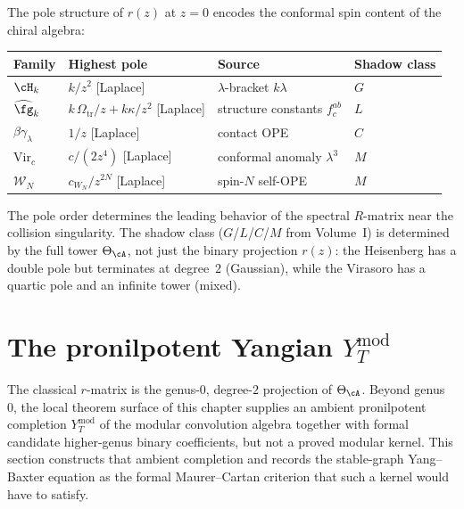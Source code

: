 \begin{remark}
The pole structure of $r(z)$ at $z = 0$ encodes the conformal
spin content of the chiral algebra:
\begin{center}
\small
\renewcommand{\arraystretch}{1.15}
\begin{tabular}{llll}
\textbf{Family} & \textbf{Highest pole} & \textbf{Source} &
\textbf{Shadow class} \\
\hline
$\cH_k$ & $k/z^2$ [Laplace] & $\lambda$-bracket $k\lambda$ & $G$ \\
$\widehat{\fg}_k$ & $k\,\Omega_{\mathrm{tr}}/z + k\kappa/z^2$ [Laplace] & structure constants $f^{ab}_c$ & $L$ \\
$\beta\gamma_\lambda$ & $1/z$ [Laplace] & contact OPE & $C$ \\
$\mathrm{Vir}_c$ & $c/(2z^4)$ [Laplace] & conformal anomaly $\lambda^3$ & $M$ \\
$\mathcal{W}_N$ & $c_{W_N}/z^{2N}$ [Laplace] & spin-$N$ self-OPE & $M$ \\
\end{tabular}
\end{center}
The pole order determines the leading behavior of the spectral
$R$-matrix near the collision singularity. The shadow class
($G$/$L$/$C$/$M$ from Volume~I) is determined by the full tower
$\Theta_\cA$, not just the binary projection $r(z)$: the
Heisenberg has a double pole but terminates at degree~$2$
(Gaussian), while the Virasoro has a quartic pole and an infinite
tower (mixed).
\end{remark}



\section{The pronilpotent Yangian $Y_T^{\mathrm{mod}}$}

The classical $r$-matrix is the genus-$0$, degree-$2$ projection of
$\Theta_\cA$. Beyond genus~$0$, the local theorem surface of this
chapter supplies an ambient pronilpotent completion
$Y_T^{\mathrm{mod}}$ of the modular convolution algebra together with
formal candidate higher-genus binary coefficients, but not a proved
modular kernel. This section constructs that ambient completion and
records the stable-graph Yang--Baxter equation as the formal
Maurer--Cartan criterion that such a kernel would have to satisfy.

